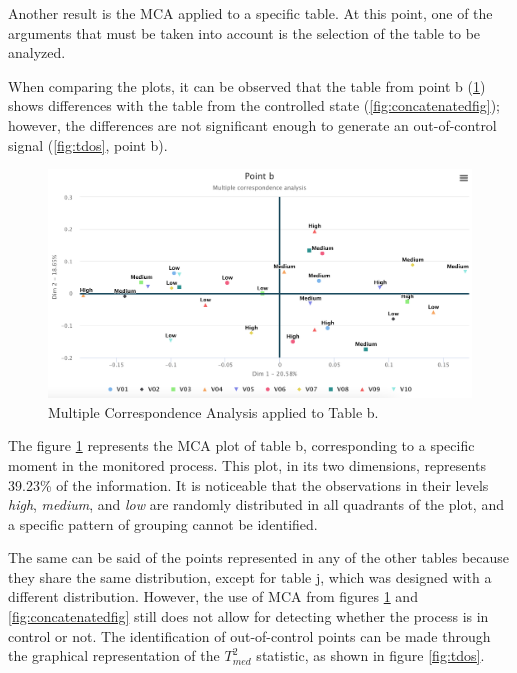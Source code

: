 \documentclass[mathematics,article,submit,moreauthors,pdftex]{mdpi}
\begin{document}
Another result is the MCA applied to a specific table. At this point,
one of the arguments that must be taken into account is the selection of
the table to be analyzed.

When comparing the plots, it can be observed that the table from point b
(\ref{fig:bfig}) shows differences with the table from the controlled
state (\ref{fig:concatenatedfig}); however, the differences are not
significant enough to generate an out-of-control signal (\ref{fig:tdos},
point b).

\begin{figure}[H]


\begin{center}\includegraphics[width=0.9\linewidth,]{pointb} \end{center}

\caption{Multiple Correspondence Analysis applied to Table b.}

\label{fig:bfig}
\end{figure}

The figure \ref{fig:bfig} represents the MCA plot of table b,
corresponding to a specific moment in the monitored process. This plot,
in its two dimensions, represents 39.23\% of the information. It is
noticeable that the observations in their levels \emph{high},
\emph{medium}, and \emph{low} are randomly distributed in all quadrants
of the plot, and a specific pattern of grouping cannot be identified.

The same can be said of the points represented in any of the other
tables because they share the same distribution, except for table j,
which was designed with a different distribution. However, the use of
MCA from figures \ref{fig:bfig} and \ref{fig:concatenatedfig} still does
not allow for detecting whether the process is in control or not. The
identification of out-of-control points can be made through the
graphical representation of the \(T^2_{med}\) statistic, as shown in
figure \ref{fig:tdos}.
\end{document}
